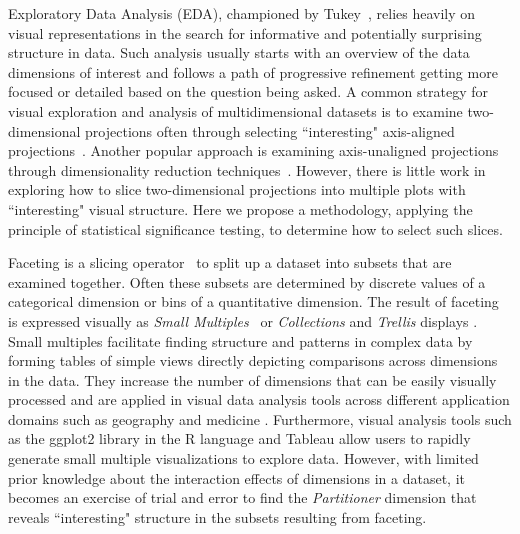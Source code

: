 
Exploratory Data Analysis (EDA), championed by Tukey~\cite{Tukey1977}, relies heavily on visual representations in the search for informative and potentially surprising structure in data. Such analysis usually starts with an overview of the data dimensions of interest and follows a path of progressive refinement getting more focused or detailed based on the question being asked. A common strategy for visual exploration and analysis of multidimensional datasets is to examine two-dimensional projections often through selecting ``interesting" axis-aligned projections~\cite{Seo2005,Wilkinson2005,Sips2009}. Another popular approach is examining axis-unaligned projections through dimensionality reduction techniques~\cite{Friedman1974,Yang2003,Sedlmair2013}. However, there is little work in exploring how to slice two-dimensional projections into multiple plots with ``interesting" visual structure. Here we propose a methodology, applying the principle of statistical significance testing, to determine how to select such slices. 
 
Faceting is a slicing operator~\cite{Wilkinson2005GG, Munzner2014} to split up a dataset into subsets that are examined together. Often these subsets are determined by discrete values of a categorical dimension or bins of a quantitative dimension. The result of faceting is expressed visually as \textit{Small Multiples}~\cite{tufte1986} or \textit{Collections}\cite{Bertin1983} and \textit{Trellis} displays \cite{Becker1996}. Small multiples facilitate finding structure and patterns in complex data by forming tables of simple views directly depicting comparisons across dimensions in the data. They increase the number of dimensions that can be easily visually processed and are applied in visual data analysis tools across different application domains such as geography \cite{Guo2006, Maceachren2003} and medicine \cite{Lunzer2010, Sarni2005}. Furthermore, visual analysis tools such as the ggplot2 library in the R language \cite{Wickham2006} and Tableau \cite{Stolte2002} allow users to rapidly generate small multiple visualizations to explore data. However, with limited prior knowledge about the interaction effects of dimensions in a dataset, it becomes an exercise of trial and error to find the \textit{Partitioner} dimension that reveals ``interesting" structure in the subsets resulting from faceting.

